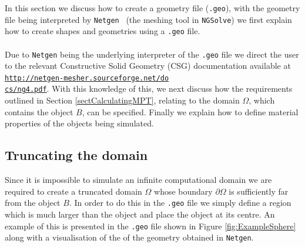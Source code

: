 In this section we discuss how to create a geometry file (\texttt{.geo}), with the geometry file being interpreted by \texttt{Netgen}~\cite{netgen} (the meshing tool in \texttt{NGSolve}) we first explain how to create shapes and geometries using a \texttt{.geo} file. \\
\\
Due to \texttt{Netgen} being the underlying interpreter of the \texttt{.geo} file we direct the user to the relevant Constructive Solid Geometry (CSG) documentation available at \href{http://netgen-mesher.sourceforge.net/docs/ng4.pdf}{\texttt{http://netgen-mesher.sourceforge.net/do\\cs/ng4.pdf}}. With this knowledge of this,  we next discuss how the requirements outlined in Section \ref{sectCalculatingMPT}, relating to the  domain $\Omega $, which contains the object $B$, can be specified.
 Finally we explain how to define material properties of the objects being simulated.
\subsection{Truncating the domain}\label{sectTruncating}
Since it is impossible to simulate an infinite computational domain we are required to create a truncated domain $\Omega$ whose boundary $\partial\Omega$ is sufficiently far from the object $B$. In order to do this in the \texttt{.geo} file we simply define a  region which is much larger than the object and place the object at its centre. An example of this is  presented in the \texttt{.geo} file  shown in Figure \ref{fig:ExampleSphere} along with a visualisation of the of the geometry obtained in \texttt{Netgen}.

